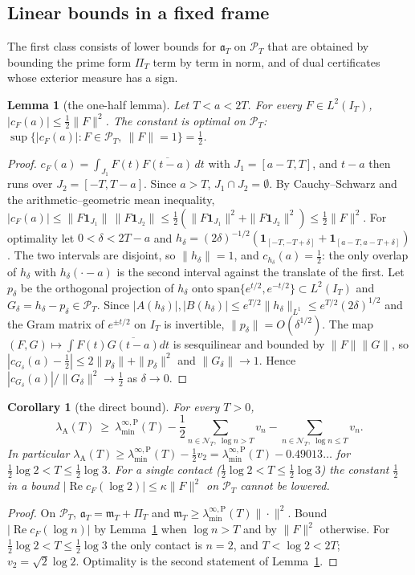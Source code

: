\documentclass[11pt]{amsart}
\newtheorem{lemma}[theorem]{Lemma}
\newtheorem{corollary}[theorem]{Corollary}
\theoremstyle{definition}
\theoremstyle{remark}
\newcommand{\Rel}{\operatorname{Re}}
\newcommand{\PT}{\mathcal P_T}
\newcommand{\IT}{I_T}
\newcommand{\lamA}{\lambda_{\mathrm A}(T)}
\newcommand{\cF}{c_F}
\newcommand{\NT}{\mathcal N_T}
\newcommand{\PiT}{\Pi_T}
\newcommand{\mT}{\mathfrak m_T}
\newcommand{\laminfP}{\lambda^{\infty,\mathrm P}_{\min}}
\begin{document}
\subsection{Linear bounds in a fixed frame}\label{subsec:bar-lin}

The first class consists of lower bounds for $\mathfrak a_T$ on $\PT$ that are obtained by bounding the prime
form $\PiT$ term by term in norm, and of dual certificates whose exterior measure has a sign.

\begin{lemma}[the one-half lemma]\label{lem:half}
Let $T<a<2T$. For every $F\in L^2(\IT)$, $|\cF(a)|\le\frac12\|F\|^2$. The constant is optimal on $\PT$:
$\sup\{|\cF(a)|:F\in\PT,\ \|F\|=1\}=\frac12$.
\end{lemma}
\begin{proof}
$\cF(a)=\int_{J_1}F(t)\overline{F(t-a)}\,dt$ with $J_1=[a-T,T]$, and $t-a$ then runs over $J_2=[-T,T-a]$. Since
$a>T$, $J_1\cap J_2=\emptyset$. By Cauchy--Schwarz and the arithmetic--geometric mean inequality,
$|\cF(a)|\le\|F\mathbf 1_{J_1}\|\,\|F\mathbf 1_{J_2}\|\le\frac12(\|F\mathbf 1_{J_1}\|^2+\|F\mathbf 1_{J_2}\|^2)\le\frac12\|F\|^2$.
For optimality let $0<\delta<2T-a$ and $h_\delta=(2\delta)^{-1/2}(\mathbf 1_{[-T,-T+\delta]}+\mathbf 1_{[a-T,a-T+\delta]})$.
The two intervals are disjoint, so $\|h_\delta\|=1$, and $c_{h_\delta}(a)=\frac12$: the only overlap of
$h_\delta$ with $h_\delta(\cdot-a)$ is the second interval against the translate of the first. Let $p_\delta$ be
the orthogonal projection of $h_\delta$ onto $\mathrm{span}\{e^{t/2},e^{-t/2}\}\subset L^2(\IT)$ and
$G_\delta=h_\delta-p_\delta\in\PT$. Since $|A(h_\delta)|,|B(h_\delta)|\le e^{T/2}\|h_\delta\|_{L^1}\le e^{T/2}(2\delta)^{1/2}$
and the Gram matrix of $e^{\pm t/2}$ on $\IT$ is invertible, $\|p_\delta\|=O(\delta^{1/2})$. The map
$(F,G)\mapsto\int F(t)\overline{G(t-a)}dt$ is sesquilinear and bounded by $\|F\|\|G\|$, so
$|c_{G_\delta}(a)-\frac12|\le2\|p_\delta\|+\|p_\delta\|^2$ and $\|G_\delta\|\to1$. Hence
$|c_{G_\delta}(a)|/\|G_\delta\|^2\to\frac12$ as $\delta\to0$.
\end{proof}

\begin{corollary}[the direct bound]\label{cor:directbound}
For every $T>0$,
\[
\lamA\ \ge\ \laminfP(T)-\frac12\sum_{n\in\NT,\ \log n>T}v_n-\sum_{n\in\NT,\ \log n\le T}v_n .
\]
In particular $\lamA\ge\laminfP(T)-\frac12v_2=\laminfP(T)-0.49013\ldots$ for $\frac12\log2<T\le\frac12\log3$.
For a single contact ($\frac12\log2<T\le\frac12\log3$) the constant $\frac12$ in a bound
$|\Rel\cF(\log2)|\le\kappa\|F\|^2$ on $\PT$ cannot be lowered.
\end{corollary}
\begin{proof}
On $\PT$, $\mathfrak a_T=\mT+\PiT$ and $\mT\ge\laminfP(T)\|\cdot\|^2$. Bound $|\Rel\cF(\log n)|$ by
Lemma~\ref{lem:half} when $\log n>T$ and by $\|F\|^2$ otherwise. For $\frac12\log2<T\le\frac12\log3$ the only
contact is $n=2$, and $T<\log2<2T$; $v_2=\sqrt2\log2$. Optimality is the second statement of Lemma~\ref{lem:half}.
\end{proof}
\end{document}
